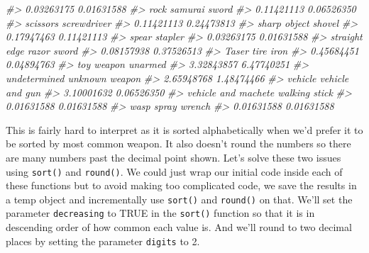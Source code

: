 \documentclass[
  12pt,
]{book}
\newenvironment{Shaded}{\begin{snugshade}}{\end{snugshade}}
\newcommand{\CommentTok}[1]{\textcolor[rgb]{0.37,0.37,0.37}{\textit{#1}}}
\begin{document}
\begin{Shaded}
\begin{Highlighting}[]
\CommentTok{\#\textgreater{}                       0.03263175                       0.01631588 }
\CommentTok{\#\textgreater{}                             rock                    samurai sword }
\CommentTok{\#\textgreater{}                       0.11421113                       0.06526350 }
\CommentTok{\#\textgreater{}                         scissors                      screwdriver }
\CommentTok{\#\textgreater{}                       0.11421113                       0.24473813 }
\CommentTok{\#\textgreater{}                     sharp object                           shovel }
\CommentTok{\#\textgreater{}                       0.17947463                       0.11421113 }
\CommentTok{\#\textgreater{}                            spear                          stapler }
\CommentTok{\#\textgreater{}                       0.03263175                       0.01631588 }
\CommentTok{\#\textgreater{}              straight edge razor                            sword }
\CommentTok{\#\textgreater{}                       0.08157938                       0.37526513 }
\CommentTok{\#\textgreater{}                            Taser                        tire iron }
\CommentTok{\#\textgreater{}                       0.45684451                       0.04894763 }
\CommentTok{\#\textgreater{}                       toy weapon                          unarmed }
\CommentTok{\#\textgreater{}                       3.32843857                       6.47740251 }
\CommentTok{\#\textgreater{}                     undetermined                   unknown weapon }
\CommentTok{\#\textgreater{}                       2.65948768                       1.48474466 }
\CommentTok{\#\textgreater{}                          vehicle                  vehicle and gun }
\CommentTok{\#\textgreater{}                       3.10001632                       0.06526350 }
\CommentTok{\#\textgreater{}              vehicle and machete                    walking stick }
\CommentTok{\#\textgreater{}                       0.01631588                       0.01631588 }
\CommentTok{\#\textgreater{}                       wasp spray                           wrench }
\CommentTok{\#\textgreater{}                       0.01631588                       0.01631588}
\end{Highlighting}
\end{Shaded}

This is fairly hard to interpret as it is sorted alphabetically when we'd prefer it to be sorted by most common weapon. It also doesn't round the numbers so there are many numbers past the decimal point shown. Let's solve these two issues using \texttt{sort()} and \texttt{round()}. We could just wrap our initial code inside each of these functions but to avoid making too complicated code, we save the results in a temp object and incrementally use \texttt{sort()} and \texttt{round()} on that. We'll set the parameter \texttt{decreasing} to TRUE in the \texttt{sort()} function so that it is in descending order of how common each value is. And we'll round to two decimal places by setting the parameter \texttt{digits} to 2.
\end{document}
